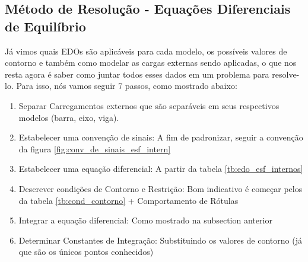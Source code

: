 \documentclass{article}
\begin{document}
\subsection{Método de Resolução - Equações Diferenciais de Equilíbrio}
Já vimos quais EDOs são aplicáveis para cada modelo, os possíveis valores de contorno e também como modelar as cargas externas sendo aplicadas, o que nos resta agora é saber como
juntar todos esses dados em um problema para resolve-lo. Para isso, nós vamos seguir 7 passos, como mostrado abaixo:
\begin{enumerate}\addtocounter{enumi}{-1}%
    \item Separar Carregamentos externos que são separáveis em seus respectivos modelos (barra, eixo, viga).
    \item Estabelecer uma convenção de sinais: A fim de padronizar, seguir a convenção da figura \ref{fig:conv_de_sinais_esf_intern}
    \item Estabelecer uma equação diferencial: A partir da tabela \ref{tb:edo_esf_internos}
    \item Descrever condições de Contorno e Restrição: Bom indicativo é começar pelos da tabela \ref{tb:cond_contorno} + Comportamento de Rótulas
    \item Integrar a equação diferencial: Como mostrado na subsection anterior
    \item Determinar Constantes de Integração: Substituindo os valores de contorno (já que são os únicos pontos conhecidos)
\end{enumerate}
\end{document}
